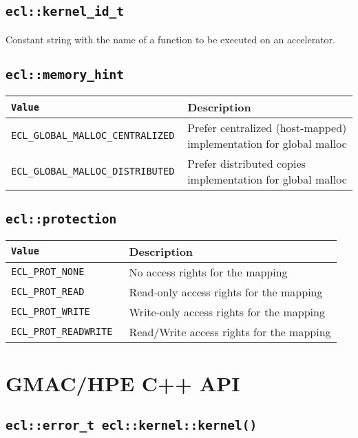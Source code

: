 \subsection{\texttt{ecl::kernel\_id\_t}}

Constant string with the name of a function to be executed on an accelerator.

\subsection{\texttt{ecl::memory\_hint}}

\begin{tabularx}{\linewidth}{|>{\texttt\bgroup}l<{\egroup}|X|}
  \hline
  \textnormal{Value} & Description \\
  \hline
  \hline
  ECL\_GLOBAL\_MALLOC\_CENTRALIZED & Prefer centralized (host\hyp{}mapped) implementation for global 
  malloc \\
  ECL\_GLOBAL\_MALLOC\_DISTRIBUTED & Prefer distributed copies implementation for global malloc \\
  \hline
\end{tabularx}


\subsection{\texttt{ecl::protection}}

\begin{tabularx}{\linewidth}{|>{\texttt\bgroup}l<{\egroup}|X|}
  \hline
  \textnormal{Value} & Description \\
  \hline
  \hline
  ECL\_PROT\_NONE  & No access rights for the mapping \\
  ECL\_PROT\_READ  & Read\hyp{}only access rights for the mapping \\
  ECL\_PROT\_WRITE & Write\hyp{}only access rights for the mapping \\
  ECL\_PROT\_READWRITE & Read\slash{}Write access rights for the mapping \\
  \hline
\end{tabularx}

\section{GMAC\slash HPE C++ API}

\subsection{\texttt{ecl::error\_t ecl::kernel::kernel()}}


